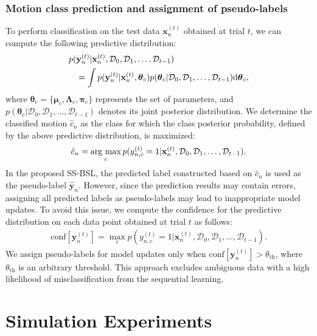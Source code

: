 \documentclass[letterpaper, 10 pt, conference]{ieeeconf}
\newcommand{\argmax}{\mathop{\rm arg\ max}\limits}%
\begin{document}
\subsubsection{Motion class prediction and assignment of pseudo-labels}
To perform classification on the test data $\mathbf{x}_{n}^{(t)}$ obtained at trial $t$, we can compute the following predictive distribution:
\begin{align}
  p(&\mathbf{y}_{n}^{(t)} | \mathbf{x}_{n}^{(t)}, \mathcal{D}_0, \mathcal{D}_{1}, \ldots, \mathcal{D}_{t-1})\notag \\ 
  &= \int p(\mathbf{y}_{n}^{(t)} | \mathbf{x}_{n}^{(t)}, \boldsymbol{\theta}_c) p(\boldsymbol{\theta}_c | \mathcal{D}_0, \mathcal{D}_1, \ldots, \mathcal{D}_{t-1}) \mathrm{d} \boldsymbol{\theta}_c, \label{kankeishiki}
\end{align}
where $\boldsymbol{\theta}_{c}=\{\boldsymbol{\mu}_{c}, \boldsymbol{\Lambda}_{c},\boldsymbol{\pi}_c\}$ represents the set of parameters, and $p(\boldsymbol{\theta}_c | \mathcal{D}_0, \mathcal{D}_1, \ldots, \mathcal{D}_{t-1})$ denotes its joint posterior distribution.
We determine the classified motion $\hat{c}_n$ as the class for which the class posterior probability, defined by the above predictive distribution, is maximized:
\begin{align}
  \hat{c}_n=\argmax_{c}p(y_{n,c}^{(t)}=1|\mathbf{x}_{n}^{(t)}, \mathcal{D}_0, \mathcal{D}_1, \ldots, \mathcal{D}_{t-1}).
\end{align}
In the proposed SS-BSL, the predicted label constructed based on $\hat{c}_n$ is used as the pseudo-label $\hat{\mathbf{y}}_n$. However, since the prediction results may contain errors, assigning all predicted labels as pseudo-labels may lead to inappropriate model updates.
To avoid this issue, we compute the confidence for the predictive distribution on each data point obtained at trial $t$ as follows:
\begin{align}
  \mathrm{conf}[\mathbf{y}_{n}^{(t)}] = \max_c p(y_{n,c}^{(t)} = 1 | \mathbf{x}_n^{(t)}, \mathcal{D}_0,  \mathcal{D}_1, \ldots, \mathcal{D}_{t-1}). \label{shikiichi}
\end{align}
We assign pseudo-labels for model updates only when $\mathrm{conf}[\mathbf{y}_{n}^{(t)}]>\theta_\mathrm{th}$, where $\theta_\mathrm{th}$ is an arbitrary threshold.
This approach excludes ambiguous data with a high likelihood of misclassification from the sequential learning.

\section{Simulation Experiments}
\end{document}

